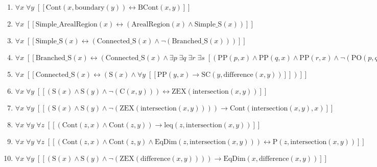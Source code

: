 \documentclass{article}
\begin{document}
\begin{enumerate}
\item $\forall x\; \forall y\;  \left[ \left[ \textrm{Cont}(x,\textrm{boundary}(y)) \leftrightarrow \textrm{BCont}(x,y) \right] \right]$
\item $\forall x\;  \left[ \left[ \textrm{Simple\_ArealRegion}(x) \leftrightarrow \left(\textrm{ArealRegion}(x) \land \textrm{Simple\_S}(x)\right) \right] \right]$
\item $\forall x\;  \left[ \left[ \textrm{Simple\_S}(x) \leftrightarrow \left(\textrm{Connected\_S}(x) \land \neg \left(\textrm{Branched\_S}(x)\right)\right) \right] \right]$
\item $\forall x\;  \left[ \left[ \textrm{Branched\_S}(x) \leftrightarrow \left(\textrm{Connected\_S}(x) \land \exists p\; \exists q\; \exists r\; \exists s\;  \left[ \left(\textrm{PP}(p,x) \land \textrm{PP}(q,x) \land \textrm{PP}(r,x) \land \neg \left(\textrm{PO}(p,q)\right) \land \neg \left(\textrm{PO}(p,r)\right) \land \neg \left(\textrm{PO}(q,r)\right) \land \textrm{Covers}(p,s) \land \textrm{Covers}(q,s) \land \textrm{Covers}(r,s) \land \textrm{Cont}(s,p) \land \textrm{Cont}(s,q) \land \textrm{Cont}(s,r)\right) \right]\right) \right] \right]$
\item $\forall x\;  \left[ \left[ \textrm{Connected\_S}(x) \leftrightarrow \left(\textrm{S}(x) \land \forall y\;  \left[ \left[ \textrm{PP}(y,x) \rightarrow \textrm{SC}(y,\textrm{difference}(x,y)) \right] \right]\right) \right] \right]$
\item $\forall x\; \forall y\;  \left[ \left[ \left(\textrm{S}(x) \land \textrm{S}(y) \land \neg \left(\textrm{C}(x,y)\right)\right) \leftrightarrow \textrm{ZEX}(\textrm{intersection}(x,y)) \right] \right]$
\item $\forall x\; \forall y\;  \left[ \left[ \left(\textrm{S}(x) \land \textrm{S}(y) \land \neg \left(\textrm{ZEX}(\textrm{intersection}(x,y))\right)\right) \rightarrow \textrm{Cont}(\textrm{intersection}(x,y),x) \right] \right]$
\item $\forall x\; \forall y\; \forall z\;  \left[ \left[ \left(\textrm{Cont}(z,x) \land \textrm{Cont}(z,y)\right) \rightarrow \textrm{leq}(z,\textrm{intersection}(x,y)) \right] \right]$
\item $\forall x\; \forall y\; \forall z\;  \left[ \left[ \left(\textrm{Cont}(z,x) \land \textrm{Cont}(z,y) \land \textrm{EqDim}(z,\textrm{intersection}(x,y))\right) \leftrightarrow \textrm{P}(z,\textrm{intersection}(x,y)) \right] \right]$
\item $\forall x\; \forall y\;  \left[ \left[ \left(\textrm{S}(x) \land \textrm{S}(y) \land \neg \left(\textrm{ZEX}(\textrm{difference}(x,y))\right)\right) \rightarrow \textrm{EqDim}(x,\textrm{difference}(x,y)) \right] \right]$

\end{enumerate}
\end{document}
